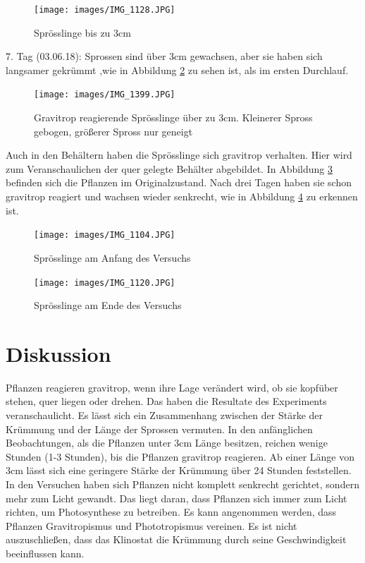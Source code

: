 \documentclass[
11pt, 
ngerman,
listof=totocnumbered,
oneside,
bibliography=totocnumbered,
abstracton
]{scrreprt}
\begin{document}
\begin{figure}[H]
	\centering 
	\texttt{[image: images/IMG\_1128.JPG]}
	\caption{Sprösslinge bis zu 3cm \label{Foto 4}}
\end{figure}

7. Tag (03.06.18): Sprossen sind über 3cm gewachsen, aber sie haben sich langsamer gekrümmt ,wie in Abbildung \ref{Foto 5} zu sehen ist, als im ersten Durchlauf.

\begin{figure}[H]
	 \centering 
  \texttt{[image: images/IMG\_1399.JPG]}
  	\caption{Gravitrop reagierende Sprösslinge über zu 3cm. Kleinerer Spross gebogen, größerer Spross nur geneigt \label{Foto 5}}
\end{figure} 

 Auch in den Behältern haben die Sprösslinge sich gravitrop verhalten. Hier wird zum Veranschaulichen der quer gelegte Behälter abgebildet.
 In Abbildung \ref{Foto 6} befinden sich die Pflanzen im Originalzustand. Nach drei Tagen haben sie schon gravitrop reagiert und wachsen wieder senkrecht, wie in Abbildung \ref{Foto 7} zu erkennen ist.

\begin{figure}[H]
	\centering 
	\texttt{[image: images/IMG\_1104.JPG]}
	\caption{Sprösslinge am Anfang des Versuchs \label{Foto 6}}
\end{figure} 

\begin{figure}[H]
	\centering 
	\texttt{[image: images/IMG\_1120.JPG]}
	\caption{Sprösslinge am Ende des Versuchs \label{Foto 7}}
\end{figure} 


\section{Diskussion}

Pflanzen reagieren gravitrop, wenn ihre Lage verändert wird, ob sie kopfüber stehen, quer liegen oder drehen. Das haben die Resultate des Experiments  veranschaulicht. Es lässt sich ein Zusammenhang zwischen der Stärke der Krümmung und der Länge der Sprossen vermuten. In den anfänglichen Beobachtungen, als die Pflanzen unter 3cm Länge besitzen, reichen wenige Stunden (1-3 Stunden), bis die Pflanzen gravitrop reagieren. Ab einer Länge von 3cm lässt sich eine geringere Stärke der Krümmung über 24 Stunden feststellen.
In den Versuchen haben sich Pflanzen nicht komplett senkrecht gerichtet, sondern mehr zum Licht gewandt. Das liegt daran, dass Pflanzen sich immer zum Licht richten, um Photosynthese zu betreiben. Es kann angenommen werden, dass Pflanzen Gravitropismus und Phototropismus vereinen.
Es ist nicht auszuschließen, dass das Klinostat die Krümmung durch seine Geschwindigkeit beeinflussen kann.
\end{document}
